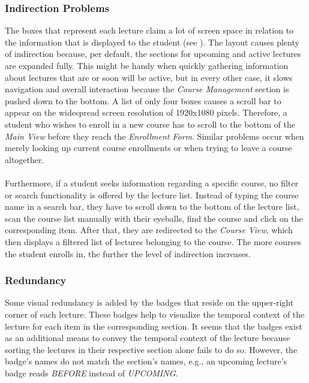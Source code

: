 \subsubsection{Indirection Problems}

The boxes that represent each lecture claim a lot of screen space in relation to the information that is displayed to the student (see ). The layout causes plenty of indirection because, per default, the sections for upcoming and active lectures are expanded fully. This might be handy when quickly gathering information about lectures that are or soon will be active, but in every other case, it slows navigation and overall interaction because the \emph{Course Management} section is pushed down to the bottom.
A list of only four boxes causes a scroll bar to appear on the widespread screen resolution of 1920x1080 pixels. Therefore, a student who wishes to enroll in a new course has to scroll to the bottom of the \emph{Main View}  before they reach the \emph{Enrollment Form}. Similar problems occur when merely looking up current course enrollments or when trying to leave a course altogether. 
\\
\\
Furthermore, if a student seeks information regarding a specific course, no filter or search functionality is offered by the lecture list. Instead of typing the course name in a search bar, they have to scroll down to the bottom of the lecture list, scan the course list manually with their eyeballs, find the course and click on the corresponding item. After that, they are redirected to the \emph{Course View}, which then displays a filtered list of lectures belonging to the course. The more courses the student enrolls in, the further the level of indirection increases. 

\subsubsection{Redundancy}

Some visual redundancy is added by the badges that reside on the upper-right corner of each lecture. These badges help to visualize the temporal context of the lecture for each item in the corresponding section. It seems that the badges exist as an additional means to convey the temporal context of the lecture because sorting the lectures in their respective section alone fails to do so.
However, the badge's names do not match the section's names, e.g., an upcoming lecture's badge reads \emph{BEFORE} instead of \emph{UPCOMING}. 

